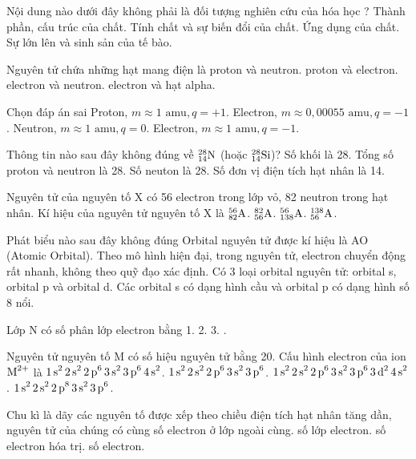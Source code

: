 \documentclass[11pt,a4paper]{article}
\begin{document}
\begin{ex}
Nội dung nào dưới đây không phải là đối tượng nghiên cứu của hóa học ?
\choice
{Thành phần, cấu trúc của chất.}
{Tính chất và sự biến đổi của chất.}
{Ứng dụng của chất.}
{\True Sự lớn lên và sinh sản của tế bào.}
\end{ex}
\begin{ex}
Nguyên tử chứa những hạt mang điện là
\choice
{proton và neutron.}
{\True proton và electron.}
{electron và neutron.}
{electron và hạt alpha.}
\end{ex}
\begin{ex}
Chọn đáp án sai
\choice
{Proton, $m \approx 1\text{ amu}, q = +1$.}
{Electron, $m \approx 0,00055\text{ amu}, q = -1$.}
{Neutron, $m \approx 1\text{ amu}, q = 0$.}
{\True Electron, $m \approx 1\text{ amu}, q = -1$.}
\end{ex}
\begin{ex}
Thông tin nào sau đây không đúng về $^{28}_{14}\ce{N}$ (hoặc $^{28}_{14}\ce{Si}$)?
\choice
{Số khối là 28.}
{Tổng số proton và neutron là 28.}
{\True Số neuton là 28.}
{Số đơn vị điện tích hạt nhân là 14.}
\end{ex}
\begin{ex}
Nguyên tử của nguyên tố X có 56 electron trong lớp vỏ, 82 neutron trong hạt nhân. Kí hiệu của nguyên tử nguyên tố X là
\choice
{$^{56}_{82}\ce{A}$.}
{$^{82}_{56}\ce{A}$.}
{$^{56}_{138}\ce{A}$.}
{\True $^{138}_{56}\ce{A}$.}
\end{ex}
\begin{ex}
Phát biểu nào sau đây không đúng
\choice
{Orbital nguyên tử được kí hiệu là AO (Atomic Orbital).}
{Theo mô hình hiện đại, trong nguyên tử, electron chuyển động rất nhanh, không theo quỹ đạo xác định.}
{\True Có 3 loại orbital nguyên tử: orbital s, orbital p và orbital d.}
{Các orbital s có dạng hình cầu và orbital p có dạng hình số 8 nổi.}
\end{ex}
\begin{ex}
Lớp N có số phân lớp electron bằng
\choice
{1.}
{2.}
{3.}
{.}
\end{ex}
\begin{ex}
Nguyên tử nguyên tố M có số hiệu nguyên tử bằng 20. Cấu hình electron của ion $\ce{M^{2+}}$ là
\choice
{$\ce{1s^2 2s^2 2p^6 3s^2 3p^6 4s^2}$.}
{\True $\ce{1s^2 2s^2 2p^6 3s^2 3p^6}$.}
{$\ce{1s^2 2s^2 2p^6 3s^2 3p^6 3d^2 4s^2}$.}
{$\ce{1s^2 2s^2 2p^8 3s^2 3p^6}$.}
\end{ex}
\begin{ex}
Chu kì là dãy các nguyên tố được xếp theo chiều điện tích hạt nhân tăng dần, nguyên tử của chúng có cùng
\choice
{số electron ở lớp ngoài cùng.}
{\True số lớp electron.}
{số electron hóa trị.}
{số electron.}
\end{ex}
\end{document}
